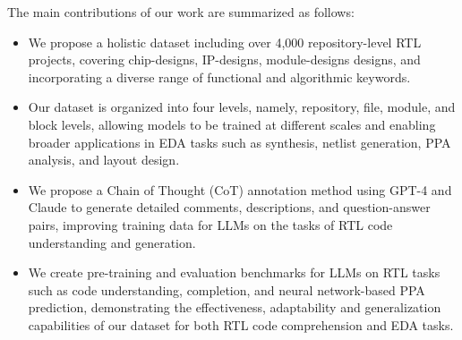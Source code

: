The main contributions of our work are summarized as follows:
\begin{itemize}
    \item We propose a holistic dataset including over 4,000 repository-level RTL projects, covering chip-designs, IP-designs, module-designs designs, and incorporating a diverse range of functional and algorithmic keywords.

    \item Our dataset is organized into four levels, namely, repository, file, module, and block levels, allowing models to be trained at different scales and enabling broader applications in EDA tasks such as synthesis, netlist generation, PPA analysis, and layout design.

    \item We propose a Chain of Thought (CoT) annotation method using GPT-4 and Claude to generate detailed comments, descriptions, and question-answer pairs, improving training data for LLMs on the tasks of RTL code understanding and generation.
    
    \item We create pre-training and evaluation benchmarks for LLMs on RTL tasks such as code understanding, completion, and neural network-based PPA prediction, demonstrating the effectiveness, adaptability and generalization capabilities of our dataset for both RTL code comprehension and EDA tasks.
\end{itemize}


